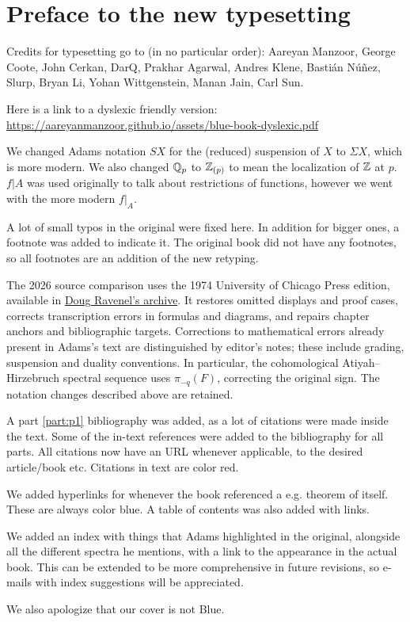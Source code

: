 \documentclass[main]{subfiles}
\begin{document}
\chapter*{Preface to the new typesetting}
Credits for typesetting go to (in no particular order): Aareyan Manzoor, George Coote, John Cerkan, DarQ, Prakhar Agarwal, Andres Klene, Bastián Núñez, Slurp, Bryan Li, Yohan Wittgenstein, Manan Jain, Carl Sun. %

Here is a link to a dyslexic friendly version: \url{https://aareyanmanzoor.github.io/assets/blue-book-dyslexic.pdf}

We changed Adams notation $SX$ for the (reduced) suspension of $X$ to $\Sigma X$, which is more modern. We also changed $\mathbb{Q}_p$ to $\mathbb{Z}_{(p)}$ to mean the localization of $\mathbb{Z}$ at $p$. $f|A$ was used originally to talk about restrictions of functions, however we went with the more modern $f|_A$.

A lot of small typos in the original were fixed here. In addition for bigger ones, a footnote was added to indicate it. The original book did not have any footnotes, so all footnotes are an addition of the new retyping. 

The 2026 source comparison uses the 1974 University of Chicago Press edition, available in \href{https://www.sas.rochester.edu/mth/sites/doug-ravenel/otherpapers/Adams-SHGH-ocr.pdf}{Doug Ravenel's archive}. It restores omitted displays and proof cases, corrects transcription errors in formulas and diagrams, and repairs chapter anchors and bibliographic targets. Corrections to mathematical errors already present in Adams's text are distinguished by editor's notes; these include grading, suspension and duality conventions. In particular, the cohomological Atiyah--Hirzebruch spectral sequence uses $\pi_{-q}(F)$, correcting the original sign. The notation changes described above are retained.

A part \ref{part:p1} bibliography was added, as a lot of citations were made inside the text. Some of the in-text references were added to the bibliography for all parts. All citations now have an URL whenever applicable, to the desired article/book etc. Citations in text are color red.

We added hyperlinks for whenever the book referenced a e.g. theorem of itself. These are always color blue. A table of contents was also added with links.

We added an index with things that Adams highlighted in the original, alongside all the different spectra he mentions, with a link to the appearance in the actual book. This can be extended to be more comprehensive in future revisions, so e-mails with index suggestions will be appreciated.

We also apologize that our cover is not Blue.
\end{document}
